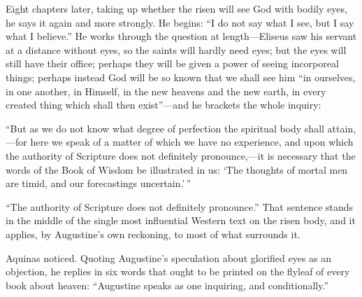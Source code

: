 Eight chapters later, taking up whether the risen will see God with bodily eyes, he says it again and more strongly. He begins: ``I do not say what I see, but I say what I believe.'' He works through the question at length---Eliseus saw his servant at a distance without eyes, so the saints will hardly need eyes; but the eyes will still have their office; perhaps they will be given a power of seeing incorporeal things; perhaps instead God will be so known that we shall see him ``in ourselves, in one another, in Himself, in the new heavens and the new earth, in every created thing which shall then exist''---and he brackets the whole inquiry:

\begin{studyframe}
``But as we do not know what degree of perfection the spiritual body shall attain,---for here we speak of a matter of which we have no experience, and upon which the authority of Scripture does not definitely pronounce,---it is necessary that the words of the Book of Wisdom be illustrated in us: `The thoughts of mortal men are timid, and our forecastings uncertain.'\,''
\end{studyframe}

``The authority of Scripture does not definitely pronounce.'' That sentence stands in the middle of the single most influential Western text on the risen body, and it applies, by Augustine's own reckoning, to most of what surrounds it.

Aquinas noticed. Quoting Augustine's speculation about glorified eyes as an objection, he replies in six words that ought to be printed on the flyleaf of every book about heaven: ``Augustine speaks as one inquiring, and conditionally.''

